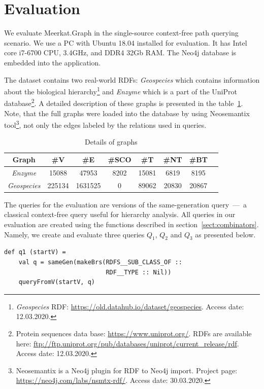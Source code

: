 \section{Evaluation}

We evaluate Meerkat.Graph in the single-source context-free path querying scenario.
We use a PC with Ubuntu 18.04 installed for evaluation.
It has Intel core i7-6700 CPU, 3.4GHz, and DDR4 32Gb RAM.
The Neo4j database is embedded into the application.

The dataset contains two real-world RDFs: \emph{Geospecies} which contains information about the biological hierarchy\footnote{\emph{Geospecies} RDF: \url{https://old.datahub.io/dataset/geospecies}. Access date: 12.03.2020.} and \emph{Enzyme} which is a part of the UniProt database\footnote{Protein sequences data base: \url{https://www.uniprot.org/}.
RDFs are available here: \url{ftp://ftp.uniprot.org/pub/databases/uniprot/current_release/rdf}. Access date: 12.03.2020.}.
A detailed description of these graphs is presented in the table~\ref{tbl:datasetDetails}.
Note, that the full graphs were loaded into the database by using Neosemantix tool\footnote{Neosemantix is a Neo4j plugin for RDF to Neo4j import. Project page: \url{https://neo4j.com/labs/nsmtx-rdf/}. Access date: 30.03.2020.}, not only the edges labeled by the relations used in queries.

{
\setlength{\tabcolsep}{4pt}
\begin{table}[ht]
\begin{tabular}{|c|c|c|c|c|c|c|c|}
\hline
 Graph      & \#V & \#E & \#SCO & \#T & \#NT & \#BT \\
 \hline
 \emph{Enzyme}     & 15088  & 47953   & 8202 & 15081 & 6819  & 8195 \\
 \emph{Geospecies} & 225134 & 1631525 & 0    & 89062 & 20830 & 20867 \\
 \hline
\end{tabular}
\caption{Details of graphs}
\label{tbl:datasetDetails}
\end{table}
}

\vspace{-0.75cm}

The queries for the evaluation are versions of the same-generation query~---~a classical context-free query useful for hierarchy analysis.
All queries in our evaluation are created using the functions described in section~\ref{sect:combinators}.
Namely, we create and evaluate three queries $Q_1$, $Q_2$ and $Q_3$ as presented below.

\begin{lstlisting}
def q1 (startV) =
    val q = sameGen(makeBrs(RDFS__SUB_CLASS_OF ::
                            RDF__TYPE :: Nil))
    queryFromV(startV, q)
\end{lstlisting}


